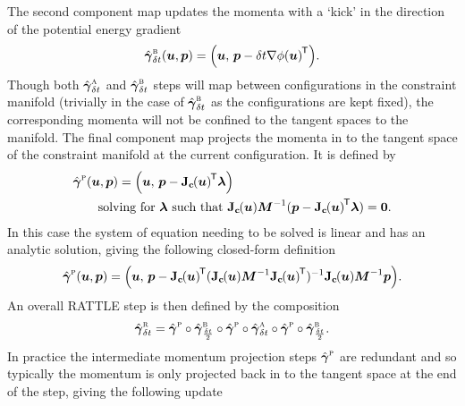 The second component map updates the momenta with a `kick' in the direction of the potential energy gradient
\begin{equation}\label{eq:rattle-step-b}
  \hat{\cflowmap}^{\textsc{b}}_{\delta t}(\vct{u},\vct{p}) =
  \lpa \vct{u},\,\vct{p}-\delta t \grad{\phi}{\vct{u}}\tr \rpa.
\end{equation}
Though both $\hat{\boldsymbol{\gamma}}_{\delta t}^{\textsc{a}}$ and $\hat{\boldsymbol{\gamma}}^{\textsc{b}}_{\delta t}$ steps will map between configurations in the constraint manifold (trivially in the case of $\hat{\boldsymbol{\gamma}}^{\textsc{b}}_{\delta t}$ as the configurations are kept fixed), the corresponding momenta will not be confined to the tangent spaces to the manifold. The final component map projects the momenta in to the tangent space of the constraint manifold at the current configuration. It is defined by
\begin{equation}
\begin{split}
  &\hat{\cflowmap}^{\textsc{p}}(\vct{u},\vct{p}) =
  \lpa \vct{u},\,\vct{p}-\jacob{\vctfunc{c}}{\vct{u}}\tr\vct{\lambda}\rpa\\
  &\qquad\textrm{solving for}~\vct{\lambda}~\textrm{such that}~\jacob{\vctfunc{c}}{\vct{u}}\mtx{M}^{-1}(\vct{p}-\jacob{\vctfunc{c}}{\vct{u}}\tr\vct{\lambda}) = \vct{0}.
\end{split}
\end{equation}
In this case the system of equation needing to be solved is linear and has an analytic solution, giving the following closed-form definition
\begin{equation}\label{eq:rattle-step-p}
  \hat{\cflowmap}^{\textsc{p}}(\vct{u},\vct{p}) =
  \lpa \vct{u},\,\vct{p}-\jacob{\vctfunc{c}}{\vct{u}}\tr(\jacob{\vctfunc{c}}{\vct{u}}\mtx{M}^{-1}\jacob{\vctfunc{c}}{\vct{u}}\tr)^{-1}\jacob{\vctfunc{c}}{\vct{u}}\mtx{M}^{-1}\vct{p}\rpa.
\end{equation}
An overall RATTLE step is then defined by the composition
\begin{equation}\label{eq:rattle-ste}
  \hat{\boldsymbol{\gamma}}^{\textsc{r}}_{\delta t} =
  \hat{\boldsymbol{\gamma}}^{\textsc{p}} \circ
  \hat{\boldsymbol{\gamma}}^{\textsc{b}}_{\frac{\delta t}{2}} \circ
  \hat{\boldsymbol{\gamma}}^{\textsc{p}} \circ
  \hat{\boldsymbol{\gamma}}_{\delta t}^{\textsc{a}} \circ
  \hat{\boldsymbol{\gamma}}^{\textsc{p}} \circ
  \hat{\boldsymbol{\gamma}}^{\textsc{b}}_{\frac{\delta t}{2}}
  .
\end{equation}
In practice the intermediate momentum projection steps $\hat{\boldsymbol{\gamma}}^{\textsc{p}}$ are redundant \citep{mclachlan2014geometric} and so typically the momentum is only projected back in to the tangent space at the end of the step, giving the following update 
